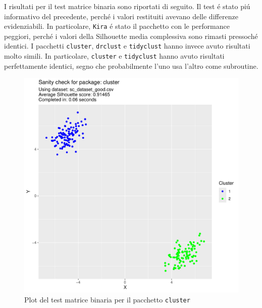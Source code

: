 \documentclass[italian]{article}
\begin{document}
			I risultati per il test matrice binaria sono riportati
			di seguito. Il test é stato piú informativo del precedente,
			perché i valori restituiti avevano delle differenze
			evidenziabili. In particolare, \texttt{Kira} é stato il
			pacchetto con le performance peggiori, perché i valori
			della Silhouette media complessiva sono rimasti pressoché
			identici. I pacchetti \texttt{cluster}, \texttt{drclust}
			e \texttt{tidyclust} hanno invece avuto risultati molto
			simili. In particolare, \texttt{cluster} e \texttt{tidyclust}
			hanno avuto risultati perfettamente identici, segno che
			probabilmente l'uno usa l'altro come subroutine.

			\begin{figure}[h]
				\includegraphics[width = \textwidth, page = 3]{results/results_CLUSTER.pdf}
				\caption{Plot del test matrice binaria per il pacchetto \texttt{cluster}}
				\label{fig:clusterbm}
			\end{figure}
\end{document}
